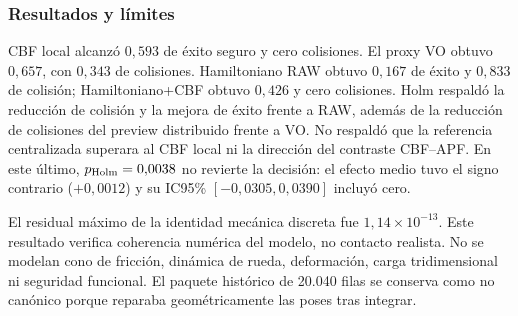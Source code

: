 \subsubsection{Resultados y límites}

CBF local alcanzó $0{,}593$ de éxito seguro y cero colisiones. El proxy VO obtuvo $0{,}657$, con $0{,}343$ de colisiones. Hamiltoniano RAW obtuvo $0{,}167$ de éxito y $0{,}833$ de colisión; Hamiltoniano+CBF obtuvo $0{,}426$ y cero colisiones. Holm respaldó la reducción de colisión y la mejora de éxito frente a RAW, además de la reducción de colisiones del preview distribuido frente a VO. No respald\'o que la referencia centralizada superara al CBF local ni la direcci\'on del contraste CBF--APF. En este \'ultimo, $p_{\rm Holm}=0{,}0038$ no revierte la decisi\'on: el efecto medio tuvo el signo contrario ($+0{,}0012$) y su IC95\% $[-0{,}0305,0{,}0390]$ incluy\'o cero.

El residual máximo de la identidad mecánica discreta fue $1{,}14\times10^{-13}$. Este resultado verifica coherencia numérica del modelo, no contacto realista. No se modelan cono de fricción, dinámica de rueda, deformación, carga tridimensional ni seguridad funcional. El paquete histórico de 20.040 filas se conserva como no canónico porque reparaba geométricamente las poses tras integrar.
